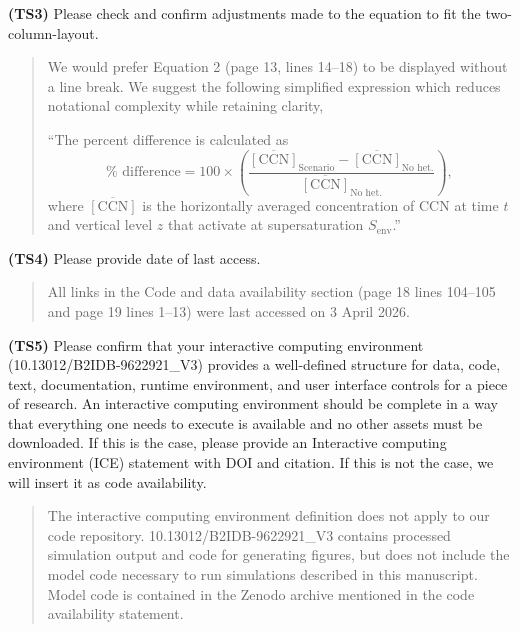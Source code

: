 \documentclass{article}
\begin{document}
\textbf{(TS3)} Please check and confirm adjustments made to the equation to fit the two-column-layout.

\begin{quote}
    We would prefer Equation 2 (page 13, lines 14--18) to be displayed without a line break. We suggest the following simplified expression which reduces notational complexity while retaining clarity, 

    ``The percent difference is calculated as 
        \begin{equation}
            \% \text{ difference} = 100\times\left(\frac{\overline{[\mathrm{CCN}]}_{\text{Scenario}} - \overline{[\mathrm{CCN}]}_{\text{No het.}}}{\overline{[\mathrm{\mathrm{CCN}}]}_{\text{No het.}}}\right),
        \end{equation}
    where $\overline{[\mathrm{CCN}]}$ is the horizontally averaged
    concentration of CCN at time $t$ and vertical level $z$ that activate
    at supersaturation $S_{\mathrm{env}}$.''
\end{quote}

\textbf{(TS4)} Please provide date of last access.

\begin{quote}
    All links in the Code and data availability section (page 18 lines 104--105 and page 19 lines 1--13) were last accessed on 3 April 2026.
\end{quote}

\textbf{(TS5)} Please confirm that your interactive computing environment (10.13012/B2IDB-9622921\_V3) provides a well-defined structure for data, code, text, documentation, runtime environment, and user interface controls for a piece of research. An interactive computing environment should be complete in a way that everything one needs to execute is available and no other assets must be downloaded. If this is the case, please provide an Interactive computing environment (ICE) statement with DOI and citation. If this is not the case, we will insert it as code availability.

\begin{quote}
    The interactive computing environment definition does not apply to our code repository. 10.13012/B2IDB-9622921\_V3 contains processed simulation output and code for generating figures, but does not include the model code necessary to run simulations described in this manuscript. Model code is contained in the Zenodo archive mentioned in the code availability statement. 
\end{quote}
\end{document}
